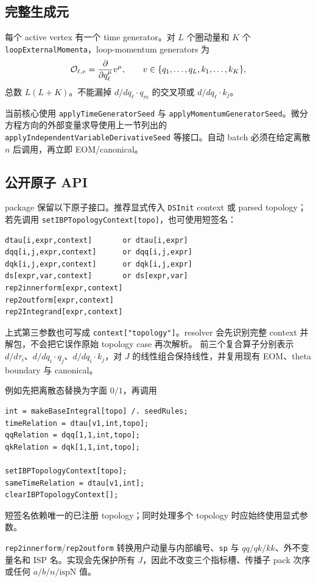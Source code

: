 ﻿\documentclass[a4paper,11pt]{article}
\begin{document}
\subsection{完整生成元}

每个 active vertex 有一个 time generator。对 $L$ 个圈动量和 $K$ 个 \texttt{loopExternal\allowbreak Momenta}，loop-momentum generators 为
\begin{equation}
 {\cal O}_{\ell,v}
 =\frac{\partial}{\partial q_\ell^\mu}v^\mu,
 \qquad
 v\in\{q_1,\ldots,q_L,k_1,\ldots,k_K\},
\end{equation}
总数 $L(L+K)$。不能漏掉 $d/dq_\ell\cdot q_m$ 的交叉项或 $d/dq_\ell\cdot k_j$。

当前核心使用 \texttt{applyTimeGeneratorSeed} 与 \texttt{applyMomentumGeneratorSeed}。微分方程方向的外部变量求导使用上一节列出的 \texttt{applyIndependentVariableDerivativeSeed} 等接口。自动 batch 必须在给定离散 $n$ 后调用，再立即 EOM/canonical。

\subsection{公开原子 API}

package 保留以下原子接口。推荐显式传入 \texttt{DSInit} context 或 parsed topology；若先调用 \texttt{setIBPTopologyContext[topo]}，也可使用短签名：
\begin{verbatim}
dtau[i,expr,context]       or dtau[i,expr]
dqq[i,j,expr,context]      or dqq[i,j,expr]
dqk[i,j,expr,context]      or dqk[i,j,expr]
ds[expr,var,context]       or ds[expr,var]
rep2innerform[expr,context]
rep2outform[expr,context]
rep2Integrand[expr,context]
\end{verbatim}
上式第三参数也可写成 \texttt{context["topology"]}。resolver 会先识别完整 context 并解包，不会把它误作原始 topology case 再次解析。
前三个复合算子分别表示 $d/d\tau_i$、$d/dq_i\cdot q_j$、$d/dq_i\cdot k_j$，对 $J$ 的线性组合保持线性，并复用现有 EOM、theta boundary 与 canonical。

例如先把离散态替换为字面 $0/1$，再调用
\begin{verbatim}
int = makeBaseIntegral[topo] /. seedRules;
timeRelation = dtau[v1,int,topo];
qqRelation = dqq[1,1,int,topo];
qkRelation = dqk[1,1,int,topo];

setIBPTopologyContext[topo];
sameTimeRelation = dtau[v1,int];
clearIBPTopologyContext[];
\end{verbatim}
短签名依赖唯一的已注册 topology；同时处理多个 topology 时应始终使用显式参数。

\texttt{rep2innerform}/\texttt{rep2outform} 转换用户动量与内部编号、\texttt{sp} 与 $qq/qk/kk$、外不变量名和 ISP 名。实现会先保护所有 $J$，因此不改变三个指标槽、传播子 pack 次序或任何 $a/b/n/\mathrm{ispN}$ 值。
\end{document}
